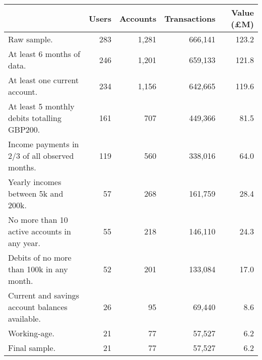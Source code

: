 \begin{tabular}{lrrrr}
\toprule
                                                & Users & Accounts & Transactions & Value (\pounds M) \\
\midrule
                                    Raw sample. &   283 &    1,281 &      666,141 &             123.2 \\
                     At least 6 months of data. &   246 &    1,201 &      659,133 &             121.8 \\
                  At least one current account. &   234 &    1,156 &      642,665 &             119.6 \\
    At least 5 monthly debits totalling GBP200. &   161 &      707 &      449,366 &              81.5 \\
 Income payments in 2/3 of all observed months. &   119 &      560 &      338,016 &              64.0 \\
            Yearly incomes between 5k and 200k. &    57 &      268 &      161,759 &              28.4 \\
   No more than 10 active accounts in any year. &    55 &      218 &      146,110 &              24.3 \\
      Debits of no more than 100k in any month. &    52 &      201 &      133,084 &              17.0 \\
Current and savings account balances available. &    26 &       95 &       69,440 &               8.6 \\
                                   Working-age. &    21 &       77 &       57,527 &               6.2 \\
                                  Final sample. &    21 &       77 &       57,527 &               6.2 \\
\bottomrule
\end{tabular}
